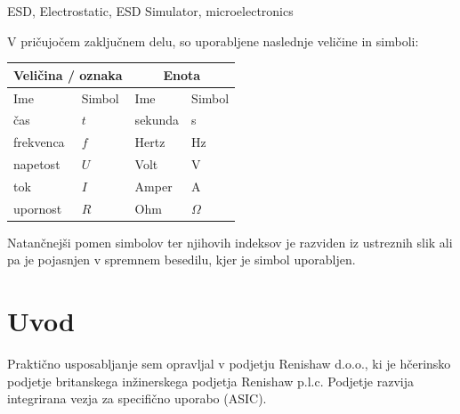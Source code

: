 \documentclass[a4paper,twoside,openright,12pt,Slovene]{book}
\begin{document}
\keywords
ESD, Electrostatic, ESD Simulator, microelectronics


\tableofcontents

\seznamslik
\seznamtabel

\seznamsimbolov
V pričujočem zaključnem delu, so uporabljene naslednje veličine in simboli:

\begin{center}
    \begin{tabular}{*{4}{l}} \hline
        \multicolumn{2}{c}{\bf{Veličina / oznaka}}           & \multicolumn{2}{c}{\bf{Enota}} \\ \hline
        Ime                & Simbol                          & Ime      & Simbol              \\ \hline
        čas                & $t$                             & sekunda  & s                   \\
        frekvenca          & $f$                             & Hertz    & Hz                  \\
        napetost           & $U$                             & Volt     & V                  \\
        tok                & $I$                             & Amper    & A                   \\
        upornost           & $R$                             & Ohm      & $\Omega$            \\ \hline

    \end{tabular}
\end{center} 

\noindent
Natančnejši pomen simbolov ter njihovih indeksov je razviden iz ustreznih slik ali pa je pojasnjen v spremnem besedilu, kjer je simbol uporabljen.

\mainmatter

\chapter{Uvod} \label{uvod}

Praktično usposabljanje sem opravljal v podjetju Renishaw d.o.o., ki je hčerinsko podjetje britanskega inžinerskega podjetja Renishaw p.l.c.  Podjetje razvija integrirana vezja za specifično uporabo (ASIC). 
\end{document}
